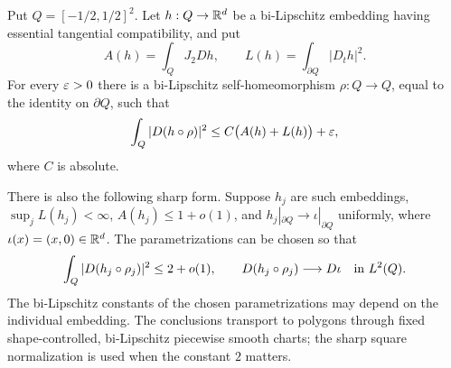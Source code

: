 \begin{lemma}
\label{lt:disk}
Put $Q=[-1/2,1/2]^2$.  Let $h:Q\to\mathbb R^d$ be a bi-Lipschitz embedding
having essential tangential compatibility, and put
\[
 A(h)=\int_Q J_2Dh,\qquad
 L(h)=\int_{\partial Q}|D_t h|^2.
\]
For every $\varepsilon>0$ there is a bi-Lipschitz self-homeomorphism
$\rho:Q\to Q$, equal to the identity on $\partial Q$, such that
\begin{equation}
 \int_Q|D(h\circ\rho)|^2
       \leq C\bigl(A(h)+L(h)\bigr)+\varepsilon,
 \label{lt:disk-weak}
\end{equation}
where $C$ is absolute.

There is also the following sharp form.  Suppose $h_j$ are such
embeddings, $\sup_jL(h_j)<\infty$,
$A(h_j)\leq1+o(1)$, and
$h_j|_{\partial Q}\to\iota|_{\partial Q}$ uniformly, where
$\iota(x)=(x,0)\in\mathbb R^d$.  The parametrizations can be chosen so that
\begin{equation}
 \int_Q|D(h_j\circ\rho_j)|^2\leq2+o(1),
 \qquad
 D(h_j\circ\rho_j)\longrightarrow D\iota
       \quad\hbox{in }L^2(Q).
 \label{lt:disk-sharp}
\end{equation}
The bi-Lipschitz constants of the chosen parametrizations may depend on
the individual embedding.  The conclusions transport to polygons
through fixed shape-controlled, bi-Lipschitz piecewise smooth charts;
the sharp square normalization is used when the constant $2$ matters.
\end{lemma}

